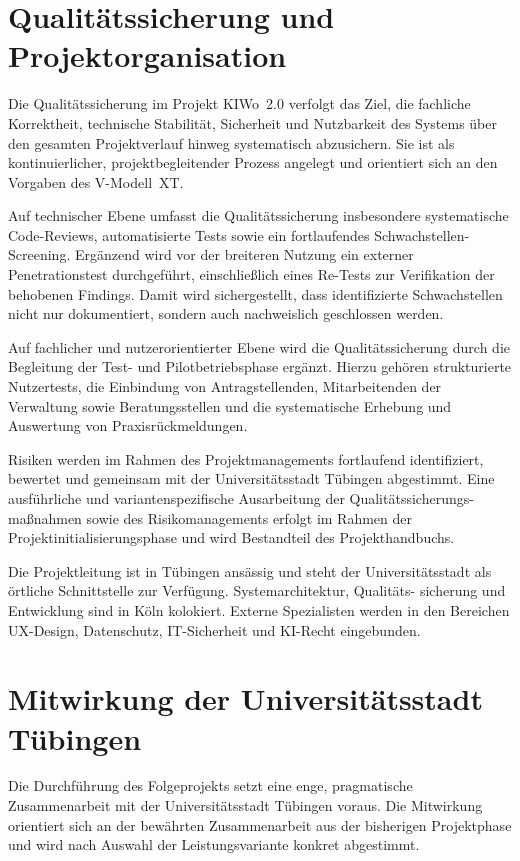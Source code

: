 \section{Qualitätssicherung und Projektorganisation}

Die Qualitätssicherung im Projekt KIWo~2.0 verfolgt das Ziel, die fachliche
Korrektheit, technische Stabilität, Sicherheit und Nutzbarkeit des Systems
über den gesamten Projektverlauf hinweg systematisch abzusichern. Sie ist
als kontinuierlicher, projektbegleitender Prozess angelegt und orientiert
sich an den Vorgaben des V-Modell~XT.

Auf technischer Ebene umfasst die Qualitätssicherung insbesondere
systematische Code-Reviews, automatisierte Tests sowie ein fortlaufendes
Schwachstellen-Screening. Ergänzend wird vor der breiteren Nutzung ein
externer Penetrationstest durchgeführt, einschließlich eines Re-Tests zur
Verifikation der behobenen Findings. Damit wird sichergestellt, dass
identifizierte Schwachstellen nicht nur dokumentiert, sondern auch
nachweislich geschlossen werden.

Auf fachlicher und nutzerorientierter Ebene wird die Qualitätssicherung
durch die Begleitung der Test- und Pilotbetriebsphase ergänzt. Hierzu
gehören strukturierte Nutzertests, die Einbindung von Antragstellenden,
Mitarbeitenden der Verwaltung sowie Beratungsstellen und die systematische
Erhebung und Auswertung von Praxisrückmeldungen.

Risiken werden im Rahmen des Projektmanagements fortlaufend identifiziert,
bewertet und gemeinsam mit der Universitätsstadt Tübingen abgestimmt. Eine
ausführliche und variantenspezifische Ausarbeitung der Qualitätssicherungs-
maßnahmen sowie des Risikomanagements erfolgt im Rahmen der
Projektinitialisierungsphase und wird Bestandteil des Projekthandbuchs.

Die Projektleitung ist in Tübingen ansässig und steht der Universitätsstadt
als örtliche Schnittstelle zur Verfügung. Systemarchitektur, Qualitäts-
sicherung und Entwicklung sind in Köln kolokiert. Externe Spezialisten
werden in den Bereichen UX-Design, Datenschutz, IT-Sicherheit und KI-Recht
eingebunden.

\section{Mitwirkung der Universitätsstadt Tübingen}

Die Durchführung des Folgeprojekts setzt eine enge, pragmatische
Zusammenarbeit mit der Universitätsstadt Tübingen voraus. Die Mitwirkung
orientiert sich an der bewährten Zusammenarbeit aus der bisherigen
Projektphase und wird nach Auswahl der Leistungsvariante konkret abgestimmt.

